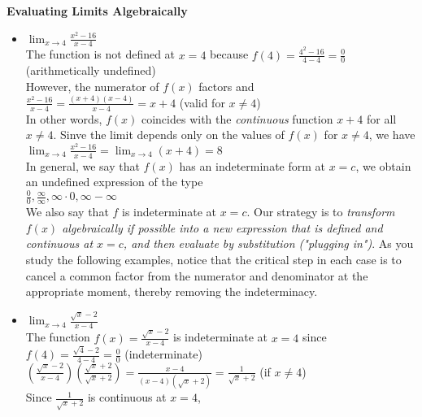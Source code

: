 \documentclass{article}
\begin{document}
	\textbf{Evaluating Limits Algebraically}
		\begin{itemize}
			\item $\lim_{x \to 4}\frac{x^2 - 16}{x - 4}$\\
				The function is not defined at $x = 4$ because $f(4) = \frac{4^2 - 16}{4 - 4}  = \frac{0}{0}$ (arithmetically undefined)\\

				However, the numerator of $f(x)$ factors and\\
				$\frac{x^2 - 16}{x - 4} = \frac{(x+4)(x-4)}{x - 4} = x + 4$ (valid for $x \neq 4$)\\
				In other words, $f(x)$ coincides with the \textit{continuous} function $x + 4$ for all $x \neq 4$. Sinve the limit depends only on the values of $f(x)$ for $x \neq 4$, we have\\
				$\lim_{x \to 4}\frac{x^2 - 16}{x - 4} = \lim_{x \to 4}(x + 4) = 8$\\

				In general, we say that $f(x)$ has an indeterminate form at $x = c$, we obtain an undefined expression of the type\\
				
				$\frac{0}{0}, \frac{\infty}{\infty}, \infty \cdot 0, \infty - \infty$\\

				We also say that $f$ is indeterminate at $x = c$. Our strategy is to \textit{transform $f(x)$ algebraically if possible into a new expression that is defined and continuous at $x = c$, and then evaluate by substitution ("plugging in")}. As you study the following examples, notice that the critical step in each case is to cancel a common factor from the numerator and denominator at the appropriate moment, thereby removing the indeterminacy.
			\item $\lim_{x \to 4}\frac{\sqrt{x} - 2}{x - 4}$\\
				The function $f(x) = \frac{\sqrt{x} - 2}{x - 4}$ is indeterminate at $x = 4$ since\\

				$f(4) = \frac{\sqrt{4} - 2}{4 - 4} = \frac{0}{0}$ (indeterminate)\\

				$(\frac{\sqrt{x} - 2}{x - 4})(\frac{\sqrt{x} + 2}{\sqrt{x} + 2}) = \frac{x - 4}{(x - 4)(\sqrt{x} + 2)} = \frac{1}{\sqrt{x} + 2}$ (if $x \neq 4$)\\

				Since $\frac{1}{\sqrt{x} + 2}$ is continuous at $x = 4$,\\


\end{itemize}
\end{document}
